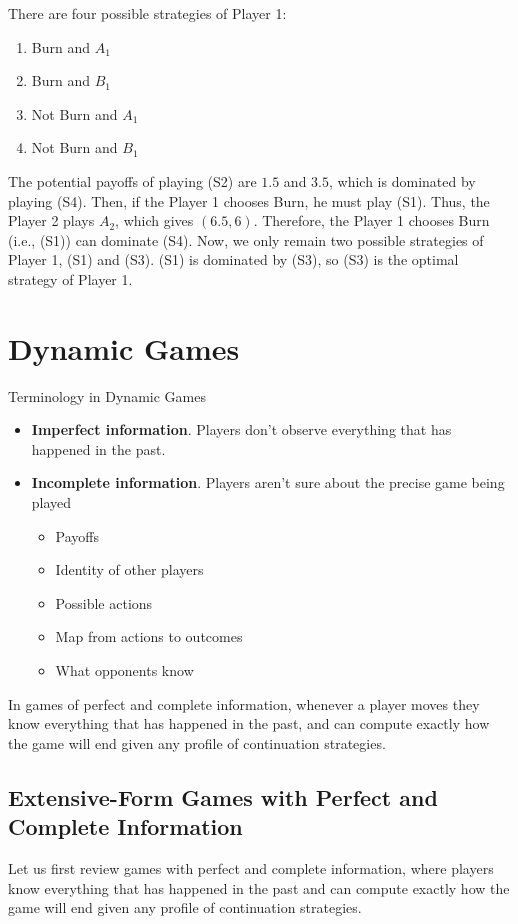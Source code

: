 \documentclass[11pt]{elegantbook_2}
\begin{document}
There are four possible strategies of Player 1:
\begin{enumerate}[(S1).]
    \item Burn and $A_1$
    \item Burn and $B_1$
    \item Not Burn and $A_1$
    \item Not Burn and $B_1$
\end{enumerate}
The potential payoffs of playing (S2) are $1.5$ and $3.5$, which is dominated by playing (S4). Then, if the Player 1 chooses Burn, he must play (S1). Thus, the Player 2 plays $A_2$, which gives $(6.5,6)$. Therefore, the Player 1 chooses Burn (i.e., (S1)) can dominate (S4). Now, we only remain two possible strategies of Player 1, (S1) and (S3). (S1) is dominated by (S3), so (S3) is the optimal strategy of Player 1.



\chapter{Dynamic Games}

Terminology in Dynamic Games
\begin{itemize}
    \item \textbf{Imperfect information}. Players don't observe everything that has happened in the past.
    \item \textbf{Incomplete information}. Players aren't sure about the precise game being played
        \begin{itemize}
            \item Payoffs
            \item Identity of other players
            \item Possible actions
            \item Map from actions to outcomes
            \item What opponents know
        \end{itemize}
\end{itemize}

In games of perfect and complete information, whenever a player moves they know everything that has happened in the past, and can compute exactly how the game will end given any profile of continuation strategies.





\section{Extensive-Form Games with Perfect and Complete Information}
Let us first review games with perfect and complete information, where players know everything that has happened in the past and can compute exactly how the game will end given any profile of continuation strategies.
\end{document}
